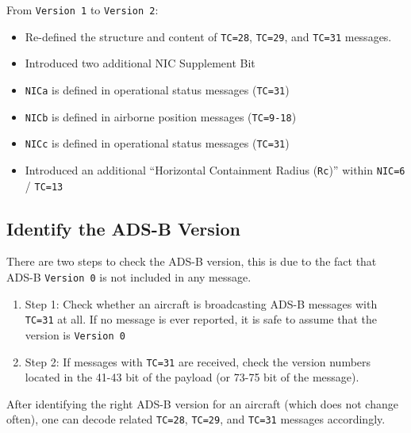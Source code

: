 From \texttt{Version\ 1} to \texttt{Version\ 2}:

\begin{itemize}
\item
  Re-defined the structure and content of \texttt{TC=28},
  \texttt{TC=29}, and \texttt{TC=31} messages.
\item
  Introduced two additional NIC Supplement Bit
\item
  \texttt{NICa} is defined in operational status messages
  (\texttt{TC=31})
\item
  \texttt{NICb} is defined in airborne position messages
  (\texttt{TC=9-18})
\item
  \texttt{NICc} is defined in operational status messages
  (\texttt{TC=31})
\item
  Introduced an additional ``Horizontal Containment Radius
  (\texttt{Rc})'' within \texttt{NIC=6} / \texttt{TC=13}
\end{itemize}

\subsection{Identify the ADS-B
Version}\label{identify-the-ads-b-version}

There are two steps to check the ADS-B version, this is due to the fact that ADS-B \texttt{Version\ 0} is not included in any message.

\begin{enumerate}
\def\labelenumi{\arabic{enumi}.}
\item
  Step 1: Check whether an aircraft is broadcasting ADS-B messages with   \texttt{TC=31} at all. If no message is ever reported, it is safe to assume that the version is \texttt{Version\ 0}
\item
  Step 2: If messages with \texttt{TC=31} are received, check the version numbers located in the 41-43 bit of the payload (or 73-75 bit of the message).
\end{enumerate}

After identifying the right ADS-B version for an aircraft (which does not change often), one can decode related \texttt{TC=28}, \texttt{TC=29}, and \texttt{TC=31} messages accordingly.
